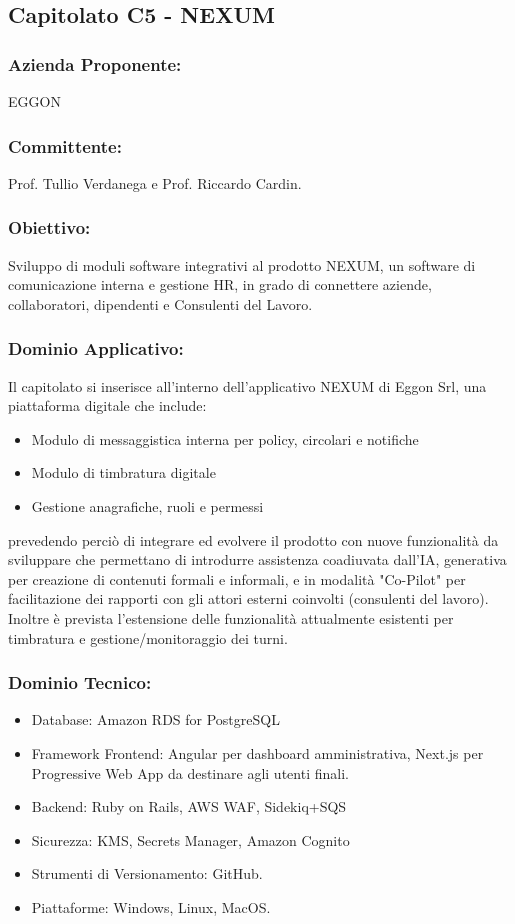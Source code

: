 \documentclass[a4paper,12pt]{article}
\begin{document}
\subsection{ Capitolato C5 - NEXUM}
\subsubsection*{Azienda Proponente:} EGGON
\subsubsection*{Committente:} Prof. Tullio Verdanega e Prof. Riccardo Cardin.
\subsubsection*{Obiettivo:}
Sviluppo di moduli software integrativi al prodotto NEXUM, un software di comunicazione interna e gestione HR, in grado di connettere aziende, collaboratori, dipendenti e Consulenti del Lavoro.
\subsubsection*{Dominio Applicativo:}
Il capitolato si inserisce all'interno dell'applicativo NEXUM di Eggon Srl, una piattaforma digitale che include:
\begin{itemize}
    \item Modulo di messaggistica interna per policy, circolari e notifiche
    \item Modulo di timbratura digitale
    \item Gestione anagrafiche, ruoli e permessi
\end{itemize}
prevedendo perciò di integrare ed evolvere il prodotto con nuove funzionalità da sviluppare che permettano di introdurre assistenza coadiuvata dall'IA, generativa per creazione di contenuti formali e informali, e in modalità "Co-Pilot" per facilitazione dei rapporti con gli attori esterni coinvolti (consulenti del lavoro). Inoltre è prevista l'estensione delle funzionalità attualmente esistenti per timbratura e gestione/monitoraggio dei turni.
 
\subsubsection*{Dominio Tecnico:}
\begin{itemize}
    \item Database: Amazon RDS for PostgreSQL
    \item Framework Frontend: Angular per dashboard amministrativa, Next.js per Progressive Web App da destinare agli utenti finali.
    \item Backend: Ruby on Rails, AWS WAF, Sidekiq+SQS
    \item Sicurezza: KMS, Secrets Manager, Amazon Cognito
    \item Strumenti di Versionamento: GitHub.
    \item Piattaforme: Windows, Linux, MacOS.
\end{itemize}
\end{document}
